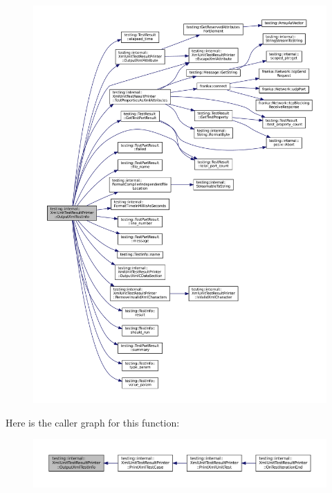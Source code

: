 \begin{figure}[H]
\begin{center}
\leavevmode
\includegraphics[width=350pt]{classtesting_1_1internal_1_1XmlUnitTestResultPrinter_af642843faed4cd28c77d688f6f2820d7_cgraph}
\end{center}
\end{figure}
Here is the caller graph for this function\+:
\nopagebreak
\begin{figure}[H]
\begin{center}
\leavevmode
\includegraphics[width=350pt]{classtesting_1_1internal_1_1XmlUnitTestResultPrinter_af642843faed4cd28c77d688f6f2820d7_icgraph}
\end{center}
\end{figure}
\mbox{\label{classtesting_1_1internal_1_1XmlUnitTestResultPrinter_a7f7accabeac896d4271f36d24ca02dba}} 
